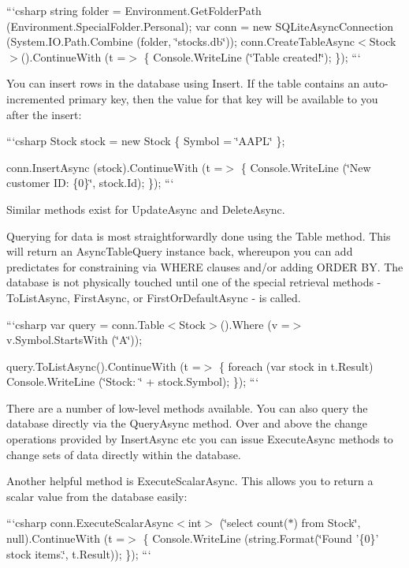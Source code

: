 ```csharp string folder = Environment.\+Get\+Folder\+Path (Environment.\+Special\+Folder.\+Personal); var conn = new S\+Q\+Lite\+Async\+Connection (System.\+I\+O.\+Path.\+Combine (folder, \char`\"{}stocks.\+db\char`\"{})); conn.\+Create\+Table\+Async$<$\+Stock$>$().Continue\+With (t =$>$ \{ Console.\+Write\+Line (\char`\"{}\+Table created!\char`\"{}); \}); ```

You can insert rows in the database using {\ttfamily Insert}. If the table contains an auto-\/incremented primary key, then the value for that key will be available to you after the insert\+:

```csharp Stock stock = new Stock \{ Symbol = \char`\"{}\+A\+A\+P\+L\char`\"{} \};

conn.\+Insert\+Async (stock).Continue\+With (t =$>$ \{ Console.\+Write\+Line (\char`\"{}\+New customer I\+D\+: \{0\}\char`\"{}, stock.\+Id); \}); ```

Similar methods exist for {\ttfamily Update\+Async} and {\ttfamily Delete\+Async}.

Querying for data is most straightforwardly done using the {\ttfamily Table} method. This will return an {\ttfamily Async\+Table\+Query} instance back, whereupon you can add predictates for constraining via W\+H\+E\+R\+E clauses and/or adding O\+R\+D\+E\+R B\+Y. The database is not physically touched until one of the special retrieval methods -\/ {\ttfamily To\+List\+Async}, {\ttfamily First\+Async}, or {\ttfamily First\+Or\+Default\+Async} -\/ is called.

```csharp var query = conn.\+Table$<$\+Stock$>$().Where (v =$>$ v.\+Symbol.\+Starts\+With (\char`\"{}\+A\char`\"{}));

query.\+To\+List\+Async().Continue\+With (t =$>$ \{ foreach (var stock in t.\+Result) Console.\+Write\+Line (\char`\"{}\+Stock\+: \char`\"{} + stock.\+Symbol); \}); ```

There are a number of low-\/level methods available. You can also query the database directly via the {\ttfamily Query\+Async} method. Over and above the change operations provided by {\ttfamily Insert\+Async} etc you can issue {\ttfamily Execute\+Async} methods to change sets of data directly within the database.

Another helpful method is {\ttfamily Execute\+Scalar\+Async}. This allows you to return a scalar value from the database easily\+:

```csharp conn.\+Execute\+Scalar\+Async$<$int$>$ (\char`\"{}select count($\ast$) from Stock\char`\"{}, null).Continue\+With (t =$>$ \{ Console.\+Write\+Line (string.\+Format(\char`\"{}\+Found '\{0\}' stock items.\char`\"{}, t.\+Result)); \}); ``` 